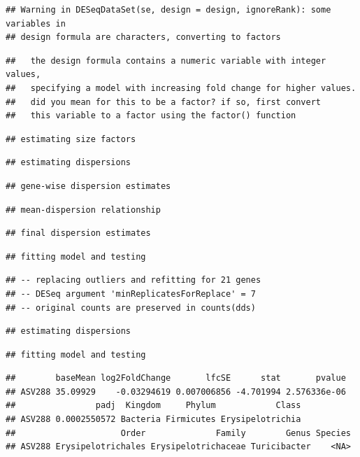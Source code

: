 \documentclass[]{article}
\begin{document}
\begin{verbatim}
## Warning in DESeqDataSet(se, design = design, ignoreRank): some variables in
## design formula are characters, converting to factors
\end{verbatim}

\begin{verbatim}
##   the design formula contains a numeric variable with integer values,
##   specifying a model with increasing fold change for higher values.
##   did you mean for this to be a factor? if so, first convert
##   this variable to a factor using the factor() function
\end{verbatim}

\begin{verbatim}
## estimating size factors
\end{verbatim}

\begin{verbatim}
## estimating dispersions
\end{verbatim}

\begin{verbatim}
## gene-wise dispersion estimates
\end{verbatim}

\begin{verbatim}
## mean-dispersion relationship
\end{verbatim}

\begin{verbatim}
## final dispersion estimates
\end{verbatim}

\begin{verbatim}
## fitting model and testing
\end{verbatim}

\begin{verbatim}
## -- replacing outliers and refitting for 21 genes
## -- DESeq argument 'minReplicatesForReplace' = 7 
## -- original counts are preserved in counts(dds)
\end{verbatim}

\begin{verbatim}
## estimating dispersions
\end{verbatim}

\begin{verbatim}
## fitting model and testing
\end{verbatim}

\begin{verbatim}
##        baseMean log2FoldChange       lfcSE      stat       pvalue
## ASV288 35.09929    -0.03294619 0.007006856 -4.701994 2.576336e-06
##                padj  Kingdom     Phylum            Class
## ASV288 0.0002550572 Bacteria Firmicutes Erysipelotrichia
##                     Order              Family        Genus Species
## ASV288 Erysipelotrichales Erysipelotrichaceae Turicibacter    <NA>
\end{verbatim}
\end{document}
